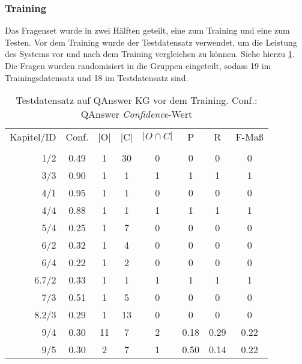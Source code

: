 \subsubsection{Training}

Das Fragenset wurde in zwei Hälften geteilt, eine zum Training und eine zum Testen.
Vor dem Training wurde der Testdatensatz verwendet, um die Leistung des Systems vor und nach dem Training vergleichen zu können.
Siehe hierzu \cref{tab:qanswervortraining}.
Die Fragen wurden randomisiert in die Gruppen eingeteilt, sodass 19 im Trainingsdatensatz und 18 im Testdatensatz sind.

\begin{longtable}{r c c c c c c c}
  \caption[Testdatensatz QAnswer vor Training]{Testdatensatz auf QAnswer KG vor dem Training.
  Conf.: QAnswer \emph{Confidence}-Wert}
  \label{tab:qanswervortraining}
  \endfirsthead
  \\
  \toprule
  Kapitel/ID    & Conf. & |O|   & |C|   & $|O \cap C|$  & P     & R     & F-Maß   \\
  \midrule \\
  \endhead
  1/2           & 0.49  & 1     & 30    & 0             & 0     & 0     & 0       \\
  3/3           & 0.90  & 1     & 1     & 1             & 1     & 1     & 1       \\
  4/1           & 0.95  & 1     & 1     & 0             & 0     & 0     & 0       \\
  4/4           & 0.88  & 1     & 1     & 1             & 1     & 1     & 1       \\
  5/4           & 0.25  & 1     & 7     & 0             & 0     & 0     & 0       \\
  6/2           & 0.32  & 1     & 4     & 0             & 0     & 0     & 0       \\
  6/4           & 0.22  & 1     & 2     & 0             & 0     & 0     & 0       \\
  6.7/2         & 0.33  & 1     & 1     & 1             & 1     & 1     & 1       \\
  7/3           & 0.51  & 1     & 5     & 0             & 0     & 0     & 0       \\
  8.2/3         & 0.29  & 1     & 13    & 0             & 0     & 0     & 0       \\
  9/4           & 0.30  & 11    & 7     & 2             & 0.18  & 0.29  & 0.22    \\
  9/5           & 0.30  & 2     & 7     & 1             & 0.50  & 0.14  & 0.22    \\

\end{longtable}
